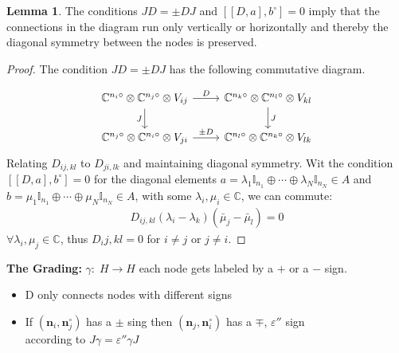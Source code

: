 \documentclass[a4paper]{article}
\theoremstyle{definition}
\theoremstyle{definition}
\theoremstyle{definition}
\theoremstyle{theorem}
\theoremstyle{theorem}
\newtheorem{lemma}{Lemma}
\theoremstyle{theorem}
\begin{document}
\begin{lemma}
    The conditions $JD = \pm DJ$ and $[[D,a], b^\circ] = 0$ imply that the
    connections in the diagram run only vertically or horizontally and thereby
    the diagonal symmetry between the nodes is preserved.
\end{lemma}
\begin{proof}
    The condition $JD = \pm DJ$ has the following commutative diagram.

\[
\begin{tikzcd}
 \mathbb{C}^{n_i\circ}\otimes \mathbb{C}^{n_j\circ}\otimes V_{ij}
    \arrow[r,"D"] \arrow[d,swap,"J"] &
 \mathbb{C}^{n_k\circ}\otimes \mathbb{C}^{n_l\circ}\otimes V_{kl}   \arrow[d,"J"] \\
\mathbb{C}^{n_j\circ}\otimes \mathbb{C}^{n_i\circ}\otimes V_{ji} \arrow[r,"\pm D"] &
\mathbb{C}^{n_l\circ}\otimes \mathbb{C}^{n_k\circ}\otimes V_{lk}
\end{tikzcd}
\]
    Relating $D_{ij, kl}$ to $D_{ji, lk}$ and maintaining diagonal symmetry.
    Wit the condition $[[D, a], b^\circ]=0$ for the diagonal elements $a =
    \lambda_1\mathbb{I}_{n_1}\oplus \cdots \oplus \lambda_N \mathbb{I}_{n_N}
    \in A$ and $b = \mu_1\mathbb{I}_{n_1}\oplus \cdots \oplus \mu_N
    \mathbb{I}_{n_N} \in A$, with some $\lambda _i , \mu _i \in \mathbb{C}$, we
    can commute:
    \begin{align}
        D_{ij, kl} (\lambda _i - \lambda _k)(\bar{\mu}_j - \bar{\mu}_l)= 0
    \end{align}
    $\forall \lambda _i , \mu _j \in \mathbb{C}$, thus $D_ij, kl = 0$ for
    $i\neq j$ or $j\neq i $.
\end{proof}
\textbf{The Grading:} $\gamma : \; H \rightarrow H$ each node gets labeled by a $+$
or a  $-$ sign.

\begin{itemize}
    \item D only connects nodes with different signs
    \item If $(\textbf{n}_i, \textbf{n}_j^\circ)$ has a $\pm$ sing then
        $(\textbf{n}_j, \textbf{n}_i^\circ)$ has a $\mp$, $\varepsilon''$ sign\\
        according to $J\gamma = \varepsilon'' \gamma J$
\end{itemize}
\end{document}
